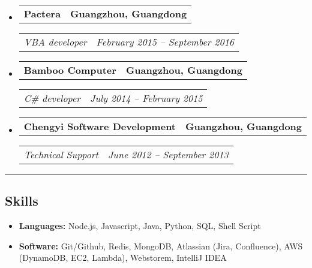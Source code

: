 \documentclass[11pt,letterpaper]{article}
\makeatletter
\newcommand{\headerrow}[2]
{\begin{tabular*}{\linewidth}{l@{\extracolsep{\fill}}r}
#1 &
#2 \\
\end{tabular*}}
\makeatother
\begin{document}
\begin{itemize}[leftmargin=1em]
	\item
	      \headerrow
	      {\textbf{Pactera}}
	      {\textbf{Guangzhou, Guangdong}}
	      \headerrow
	      {\emph{VBA developer}}
	      {\emph{February 2015 -- September 2016}}
    \item
	      \headerrow
	      {\textbf{Bamboo Computer}}
	      {\textbf{Guangzhou, Guangdong}}
	      \headerrow
	      {\emph{C\# developer}}
	      {\emph{July 2014 -- February 2015}}
    \item
	      \headerrow
	      {\textbf{Chengyi Software Development}}
	      {\textbf{Guangzhou, Guangdong}}
	      \headerrow
	      {\emph{Technical Support}}
	      {\emph{June 2012 -- September 2013}}
	      	      
\end{itemize}

\hrule
\vspace{-1em}
\subsection*{\Large Skills}

\begin{itemize}[leftmargin=1em,noitemsep]
	\item \textbf{Languages:}
	      Node.js, Javascript, Java, Python, SQL, Shell Script
	\item \textbf{Software:}
	      Git/Github, Redis, MongoDB, Atlassian (Jira, Confluence), AWS (DynamoDB, EC2, Lambda), Webstorem, IntelliJ IDEA
\end{itemize}
\end{document}
